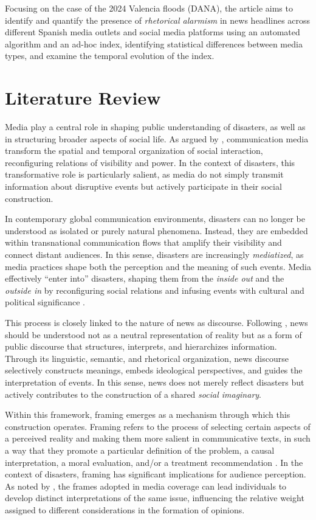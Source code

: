 Focusing on the case of the 2024 Valencia floods (DANA), the article aims to 
identify and quantify the presence of \emph{rhetorical alarmism} in news 
headlines across different Spanish media outlets and social media platforms using an automated algorithm
and an ad-hoc index, identifying statistical differences between media 
types, and examine the temporal evolution of the index.

\section{Literature Review}
Media play a central role in shaping public understanding of disasters, as well as in structuring broader aspects of social life. As argued by \textcite{Thompson1995}, 
communication media transform the spatial and temporal organization of social interaction, reconfiguring relations of visibility and power. In the context of disasters, 
this transformative role is particularly salient, as media do not simply transmit information about disruptive events but actively participate in their social construction.

In contemporary global communication environments, disasters can no longer be understood as isolated or purely natural phenomena. Instead, they are embedded 
within transnational communication flows that amplify their visibility and connect distant audiences. In this sense, disasters are increasingly \emph{mediatized}, 
as media practices shape both the perception and the meaning of such events. Media effectively “enter into” disasters, shaping them from the \emph{inside out} 
and the \emph{outside in} by reconfiguring social relations and infusing events with cultural and political significance \parencite{DisastersandtheMedia,mediatized_disasters}.

This process is closely linked to the nature of news as discourse. Following \textcite{vandijk1988}, news should be understood not as a neutral representation of 
reality but as a form of public discourse that structures, interprets, and hierarchizes information. Through its linguistic, semantic, and rhetorical 
organization, news discourse selectively constructs meanings, embeds ideological perspectives, and guides the interpretation of events. In this sense, news
 does not merely reflect disasters but actively contributes to the construction of a shared \emph{social imaginary}.

Within this framework, framing emerges as a mechanism through which this construction operates. Framing refers to the process of selecting certain aspects 
of a perceived reality and making them more salient in communicative texts, in such a way that they promote a particular definition of the problem, a causal interpretation, 
a moral evaluation, and/or a treatment recommendation \parencite{Entman1993}. In the context of disasters, framing has significant implications for 
audience perception. As noted by \textcite{Chong_Framing_Theory}, the frames adopted in media coverage can lead individuals to develop distinct interpretations 
of the same issue, influencing the relative weight assigned to different considerations in the formation of opinions.

